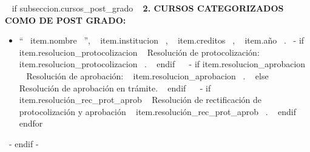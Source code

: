     ~{ if subseccion.cursos_post_grado }~
      \textbf{2. CURSOS CATEGORIZADOS COMO DE POST GRADO:}
      \begin{itemize}
      ~{ for item in subseccion.cursos_post_grado }~
        \item ``~{{ item.nombre }}~'', ~{{ item.institucion }}~, ~{{ item.creditos }}~, ~{{ item.año }}~.
              ~{- if item.resolucion_protocolizacion }~ Resolución de protocolización: ~{{ item.resolucion_protocolizacion }}~. ~{ endif }~
              ~{- if item.resolucion_aprobacion }~ Resolución de aprobación: ~{{ item.resolucion_aprobacion }}~. ~{ else }~ Resolución de aprobación en trámite. ~{ endif }~
              ~{- if item.resolución_rec_prot_aprob }~ Resolución de rectificación de protocolización y aprobación ~{{ item.resolución_rec_prot_aprob }}~. ~{ endif }~
        \espacioEntreItems{}
      ~{ endfor }~
      \end{itemize}
      \espacioEntreSubSecciones{}
    ~{- endif -}~

